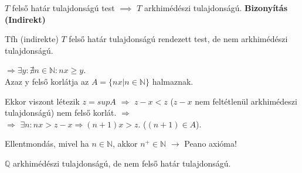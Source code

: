 \begin{frame}
  \begin{tcolorbox}[title={Tétel: Felső határ és arkhimédészi tulajdonság}]
    $T$ felső határ tulajdonságú test $\implies$ $T$ arkhimédészi tulajdonságú.
  \tcblower
    \textbf{Bizonyítás (Indirekt)}\\
    \mmedskip
    
    Tfh (indirekte) $T$ felső határ tulajdonságú rendezett test, de nem arkhimédészi tulajdonságú.\\
    \msmallskip
    
    $\Rightarrow {\exists}y : {\nexists}n \in \mathbb{N} : nx \geq y$.\\
    Azaz y felső korlátja az $A = \{ nx | n \in \mathbb{N} \}$ halmaznak.\\
    \msmallskip

    Ekkor viszont létezik $z = sup A$ $\Rightarrow$ $z - x < z$ ($z - x$ nem feltétlenül arkhimédeszi tulajdonságú) nem felső korlát. $\Rightarrow$\\
    $\Rightarrow$ ${\exists}n : nx > z - x \Rightarrow (n + 1)x > z$. ($(n + 1) \in A$).\\
    \msmallskip
    
    Ellentmondás, mivel ha $n \in \mathbb{N}$, akkor $n^+ \in \mathbb{N}$ $\rightarrow$ Peano axióma!
  \end{tcolorbox}
\end{frame}

\begin{frame}
\begin{tcolorbox}[title={Tétel: Q nem felső határ tulajdonságú}]
$\mathbb{Q}$ arkhimédészi tulajdonságú, de nem felső határ tulajdonságú.
\end{tcolorbox}
\end{frame}


